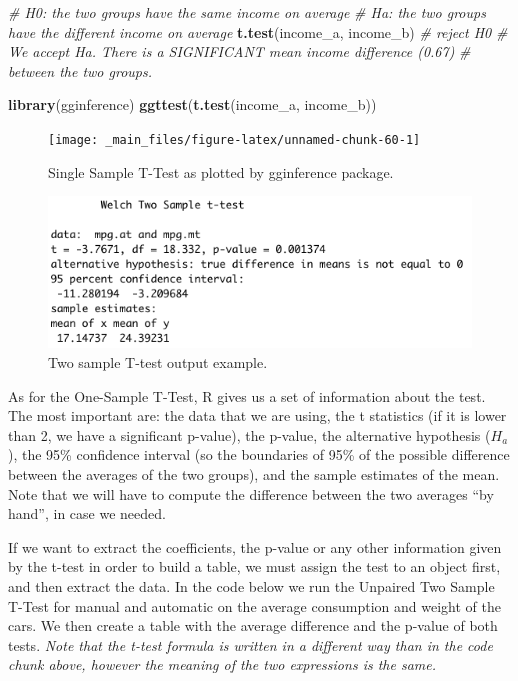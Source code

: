 \documentclass[
]{svmono}
\newenvironment{Shaded}{\begin{snugshade}}{\end{snugshade}}
\newcommand{\CommentTok}[1]{\textcolor[rgb]{0.56,0.35,0.01}{\textit{#1}}}
\newcommand{\FunctionTok}[1]{\textcolor[rgb]{0.13,0.29,0.53}{\textbf{#1}}}
\newcommand{\NormalTok}[1]{#1}
\begin{document}
\begin{Shaded}
\begin{Highlighting}[]
\CommentTok{\# H0: the two groups have the same income on average}
\CommentTok{\# Ha: the two groups have the different income on average}
\FunctionTok{t.test}\NormalTok{(income\_a, income\_b) }\CommentTok{\# reject H0}
\CommentTok{\# We accept Ha. There is a SIGNIFICANT mean income difference (0.67)}
\CommentTok{\# between the two groups.}

\FunctionTok{library}\NormalTok{(gginference)}
\FunctionTok{ggttest}\NormalTok{(}\FunctionTok{t.test}\NormalTok{(income\_a, income\_b))}
\end{Highlighting}
\end{Shaded}

\begin{figure}[H]

{\centering \texttt{[image: \_main\_files/figure-latex/unnamed-chunk-60-1]} 

}

\caption{Single Sample T-Test as plotted by gginference package.}\label{fig:unnamed-chunk-60}
\end{figure}

\begin{figure}[H]

{\centering \includegraphics[width=0.5\linewidth,]{images/Schermata 2022-03-29 alle 16.36.10} 

}

\caption{Two sample T-test output example.}\label{fig:unnamed-chunk-61}
\end{figure}

As for the One-Sample T-Test, R gives us a set of information about the
test. The most important are: the data that we are using, the t
statistics (if it is lower than 2, we have a significant p-value), the
p-value, the alternative hypothesis (\(H_a\)), the 95\% confidence interval
(so the boundaries of 95\% of the possible difference between the
averages of the two groups), and the sample estimates of the mean. Note
that we will have to compute the difference between the two averages ``by
hand'', in case we needed.

If we want to extract the coefficients, the p-value or any other
information given by the t-test in order to build a table, we must
assign the test to an object first, and then extract the data. In the
code below we run the Unpaired Two Sample T-Test for manual and
automatic on the average consumption and weight of the cars. We then
create a table with the average difference and the p-value of both
tests. \emph{Note that the t-test formula is written in a different way than
in the code chunk above, however the meaning of the two expressions is
the same.}
\end{document}
